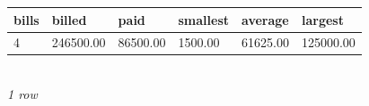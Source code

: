 {\scriptsize\setlength{\tabcolsep}{2.5pt}\begin{tabular}{llllll}\toprule
\textbf{bills} & \textbf{billed} & \textbf{paid} & \textbf{smallest} & \textbf{average} & \textbf{largest} \\\midrule
4 & 246500.00 & 86500.00 & 1500.00 & 61625.00 & 125000.00 \\
\bottomrule\end{tabular}}\\[-1pt]{\tiny\itshape 1 row}
